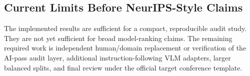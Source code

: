 \subsection{Current Limits Before NeurIPS-Style Claims}

The implemented results are sufficient for a compact, reproducible audit study. They are not yet sufficient for broad model-ranking claims. The remaining required work is independent human/domain replacement or verification of the AI-pass audit layer, additional instruction-following VLM adapters, larger balanced splits, and final review under the official target conference template.
